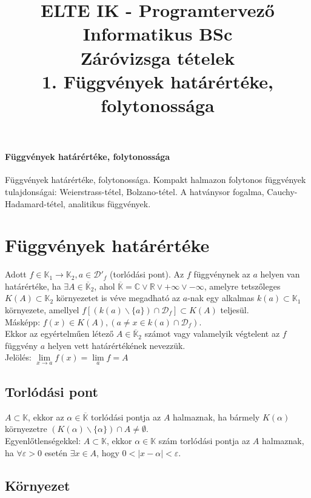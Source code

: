 \documentclass[margin=0px]{article}
\title{\textbf{{\Large ELTE IK - Programtervező Informatikus BSc} \vspace{0.2cm} \\ {\huge Záróvizsga tételek}} \vspace{0.3cm} \\ 1. Függvények határértéke, folytonossága}
\author{}
\date{}
\newenvironment{tetel}[1]{\paragraph{#1 \\}}{}
\begin{document}
\maketitle

\begin{tetel}{Függvények határértéke, folytonossága}
    Függvények határértéke, folytonossága. Kompakt halmazon folytonos függvények tulajdonságai: Weierstrass-tétel, Bolzano-tétel. A hatványsor fogalma, Cauchy-Hadamard-tétel, analitikus függvények.
\end{tetel}

\section{Függvények határértéke}

Adott $f \in \mathbb{K}_{1} \to \mathbb{K}_{2}, a \in \mathcal{D}'_{f}$ (torlódási pont). Az $f$ függvénynek az $a$ helyen van határértéke, ha $\exists A \in \overline{\mathbb{K}}_{2}$, ahol $\overline{\mathbb{K}} = \mathbb{C} \vee \mathbb{R} \vee +\infty \vee -\infty$, amelyre tetszőleges $K(A) \subset \mathbb{K}_{2}$ környezetet is véve megadható az $a$-nak egy alkalmas $k(a) \subset \mathbb{K}_{1}$ környezete, amellyel $f[(k(a) \backslash \{a\}) \cap \mathcal{D}_{f}] \subset K(A)$ teljesül. \\
Másképp: $f(x) \in K(A), (a \neq x \in k(a) \cap \mathcal{D}_{f})$. \\
Ekkor az egyértelműen létező $A \in \overline{\mathbb{K}}_{2}$ számot vagy valamelyik végtelent az $f$ függvény $a$ helyen vett határértékének nevezzük. \\
Jelölés: $\lim\limits_{x \to a}{f(x)} = \lim\limits_{a}{f} = A$

\subsection{Torlódási pont}

$A \subset \mathbb{K}$, ekkor az $\alpha \in \overline{\mathbb{K}}$ torlódási pontja az $A$ halmaznak, ha bármely $K(\alpha)$ környezetre $(K(\alpha) \backslash \{\alpha\}) \cap A \neq \emptyset$. \\
Egyenlőtlenségekkel: $A \subset \mathbb{K}$, ekkor $\alpha \in \mathbb{K}$ szám torlódási pontja az $A$ halmaznak, ha $\forall \varepsilon > 0$ esetén $\exists x \in A$, hogy $0 < |x-\alpha| < \varepsilon$.

\subsection{Környezet}
\end{document}
